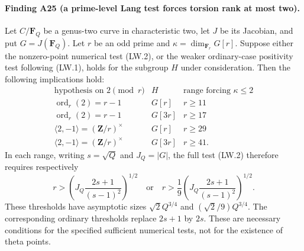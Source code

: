 \documentclass[11pt,a4paper]{article}
\begin{document}
\paragraph{Finding A25 (a prime-level Lang test forces torsion rank at most two).}
Let $C/\mathbf F_Q$ be a genus-two curve in characteristic two,
let $J$ be its Jacobian, and put $G=J(\mathbf F_Q)$.
Let $r$ be an odd prime and
$\kappa=\dim_{\mathbf F_r}G[r]$.
Suppose either the nonzero-point numerical test (LW.2), or
the weaker ordinary-case positivity test following (LW.1),
holds for the subgroup $H$ under consideration.
Then the following implications hold:
\[
\begin{array}{c|c|c}
\text{hypothesis on }2\pmod r&H&\text{range forcing }\kappa\le2\\
\hline
\operatorname{ord}_r(2)=r-1&G[r]&r\ge11\\
\operatorname{ord}_r(2)=r-1&G[3r]&r\ge17\\
\langle2,-1\rangle=(\mathbf Z/r)^\times&G[r]&r\ge29\\
\langle2,-1\rangle=(\mathbf Z/r)^\times&G[3r]&r\ge41.
\end{array}
\tag{LP.1}
\]
In each range, writing $s=\sqrt Q$ and $J_Q=|G|$, the full
test (LW.2) therefore requires respectively
\[
 r>\left(J_Q\frac{2s+1}{(s-1)^2}\right)^{1/2}
 \quad\text{or}\quad
 r>\frac19\left(J_Q\frac{2s+1}{(s-1)^2}\right)^{1/2}.
\tag{LP.2}
\]
These thresholds have asymptotic sizes
$\sqrt2 Q^{3/4}$ and $(\sqrt2/9)Q^{3/4}$.
The corresponding ordinary thresholds replace $2s+1$ by $2s$.
These are necessary conditions for the specified sufficient
numerical tests, not for the existence of theta points.
\end{document}
